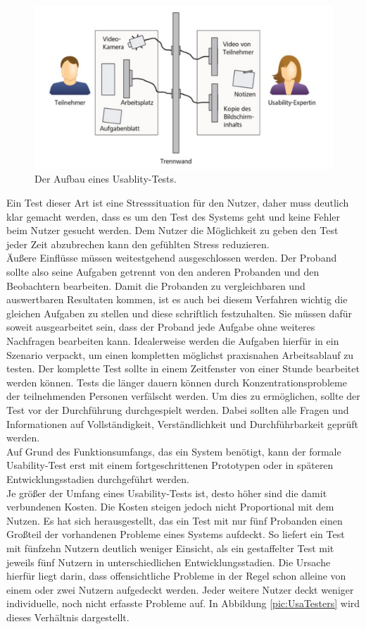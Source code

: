 \begin{description}
\begin{figure}[H]
    \centering
    \includegraphics[width=.8\textwidth]{files/usa/aufbau}
    \caption{Der Aufbau eines Usablity-Tests. \cite[S. 230]{Moser:2012cn} }
    \label{pic:UsaTestAufbau}
\end{figure}


Ein Test dieser Art ist eine Stresssituation für den Nutzer, daher muss deutlich klar gemacht werden, dass es um den Test des Systems geht und keine Fehler beim Nutzer gesucht werden. Dem Nutzer die Möglichkeit zu geben den Test jeder Zeit abzubrechen kann den gefühlten Stress reduzieren.\\
Äußere Einflüsse müssen weitestgehend ausgeschlossen werden. Der Proband sollte also seine Aufgaben getrennt von den anderen Probanden und den Beobachtern bearbeiten. Damit die Probanden zu vergleichbaren und auswertbaren Resultaten kommen, ist es auch bei diesem Verfahren wichtig die gleichen Aufgaben zu stellen und diese schriftlich festzuhalten. Sie müssen dafür soweit ausgearbeitet sein, dass der Proband jede Aufgabe ohne weiteres Nachfragen bearbeiten kann. Idealerweise werden die Aufgaben hierfür in ein Szenario verpackt, um einen kompletten möglichst praxisnahen Arbeitsablauf zu testen. Der komplette Test sollte in einem Zeitfenster von einer Stunde bearbeitet werden können. Tests die länger dauern können durch Konzentrationsprobleme der teilnehmenden Personen verfälscht werden. Um dies zu ermöglichen, sollte der Test vor der Durchführung durchgespielt werden. Dabei sollten alle Fragen und Informationen auf Vollständigkeit, Verständlichkeit und Durchführbarkeit geprüft werden. \\
Auf Grund des Funktionsumfangs, das ein System benötigt, kann der formale Usability-Test erst mit einem fortgeschrittenen Prototypen oder in späteren Entwicklungsstadien durchgeführt werden. \cite[S. 230f.]{Moser:2012cn} \\
Je größer der Umfang eines Usability-Tests ist, desto höher sind die damit verbundenen Kosten. Die Kosten steigen jedoch nicht Proportional mit dem Nutzen. Es hat sich herausgestellt, das ein Test mit nur fünf Probanden einen Großteil der vorhandenen Probleme eines Systems aufdeckt. So liefert ein Test mit fünfzehn Nutzern deutlich weniger Einsicht, als ein gestaffelter Test mit jeweils fünf Nutzern in unterschiedlichen Entwicklungsstadien. Die Ursache hierfür liegt darin, dass offensichtliche Probleme in der Regel schon alleine von einem oder zwei Nutzern aufgedeckt werden. Jeder weitere Nutzer deckt weniger individuelle, noch nicht erfasste Probleme auf. In Abbildung \ref{pic:UsaTesters} wird dieses Verhältnis dargestellt. \cite{Nielsen:uc}



\end{description}
